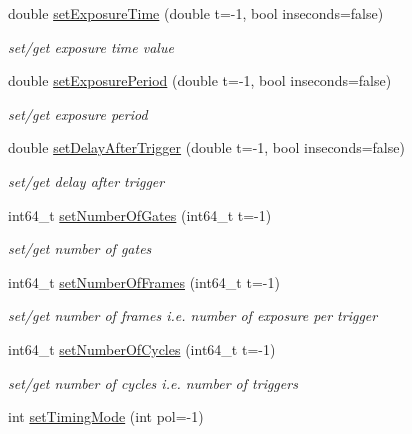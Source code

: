 \begin{CompactItemize}
double \hyperlink{classslsDetectorUsers_134225893d41bc97e9f1d645e035a04a}{set\-Exposure\-Time} (double t=-1, bool inseconds=false)
\begin{CompactList}\small\item\em set/get exposure time value \item\end{CompactList}\item 
double \hyperlink{classslsDetectorUsers_cac89084aba58ebe81420c7c9ac4217a}{set\-Exposure\-Period} (double t=-1, bool inseconds=false)
\begin{CompactList}\small\item\em set/get exposure period \item\end{CompactList}\item 
double \hyperlink{classslsDetectorUsers_99f67fab7edfe68cc8b2300e282ff3f2}{set\-Delay\-After\-Trigger} (double t=-1, bool inseconds=false)
\begin{CompactList}\small\item\em set/get delay after trigger \item\end{CompactList}\item 
int64\_\-t \hyperlink{classslsDetectorUsers_61d4acb00c997c5e02be6a191401c4ce}{set\-Number\-Of\-Gates} (int64\_\-t t=-1)
\begin{CompactList}\small\item\em set/get number of gates \item\end{CompactList}\item 
int64\_\-t \hyperlink{classslsDetectorUsers_fc82f608bf74d10f3aa866bff94cbbab}{set\-Number\-Of\-Frames} (int64\_\-t t=-1)
\begin{CompactList}\small\item\em set/get number of frames i.e. number of exposure per trigger \item\end{CompactList}\item 
int64\_\-t \hyperlink{classslsDetectorUsers_8b741851c4eaef4e29322c99fd17cb3b}{set\-Number\-Of\-Cycles} (int64\_\-t t=-1)
\begin{CompactList}\small\item\em set/get number of cycles i.e. number of triggers \item\end{CompactList}\item 
int \hyperlink{classslsDetectorUsers_e2825524756c4bdf418a6233e137b4d7}{set\-Timing\-Mode} (int pol=-1)

\end{CompactItemize}
